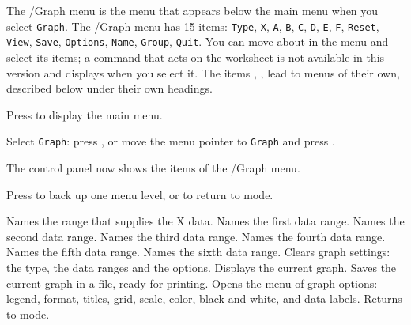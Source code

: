 The /Graph menu is the menu that appears below the main menu when you select \texttt{Graph}. The /Graph menu has 15 items: \texttt{Type}, \texttt{X}, \texttt{A}, \texttt{B}, \texttt{C}, \texttt{D}, \texttt{E}, \texttt{F}, \texttt{Reset}, \texttt{View}, \texttt{Save}, \texttt{Options}, \texttt{Name}, \texttt{Group}, \texttt{Quit}.  You can move about in the menu and select its items; a command that acts on the worksheet is not available in this version and displays  when you select it.
The items , ,  lead to menus of their own, described below under their own headings.
\begin{Steps123}
\item Press  to display the main menu.
\item Select \texttt{Graph}: press , or move the menu pointer to \texttt{Graph} and press .
\item The control panel now shows the items of the /Graph menu.
\item Press  to back up one menu level, or  to return to  mode.
\end{Steps123}
\begin{Options}
 Names the range that supplies the X data.
 Names the first data range.
 Names the second data range.
 Names the third data range.
 Names the fourth data range.
 Names the fifth data range.
 Names the sixth data range.
 Clears graph settings: the type, the data ranges and the options.
 Displays the current graph.
 Saves the current graph in a file, ready for printing.
 Opens the menu of graph options: legend, format, titles, grid, scale, color, black and white, and data labels.
 Returns to  mode.
\end{Options}

